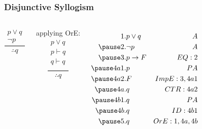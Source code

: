 \documentclass[dvipsnames]{beamer}
\begin{document}
\begin{frame}
  \frametitle{Disjunctive Syllogism}

  \begin{columns}
    \[
    \frac
      {
        \begin{array}{c}
          p \vee q\\
          \neg p
        \end{array}
      }
      {
        \therefore q
      }
    \]

    \pause
    \bigskip
    applying OrE:
    \[
    \frac
      {
        \begin{array}{c}
          p \vee q\\
          p \vdash q\\
          q \vdash q\\
        \end{array}
      }
      {
        \therefore q
      }
    \]

    \pause
    \begin{eqnarray*}
      1.   & p \vee q        & A\\
      \pause
      2.   & \neg p          & A\\
      \pause
      3.   & p \rightarrow F & EQ:2\\
      \pause
      4a1. & p               & PA\\
      \pause
      4a2. & F               & ImpE:3,4a1\\
      \pause
      4a.  & q               & CTR:4a2\\
      \pause
      4b1. & q               & PA\\
      \pause
      4b.  & q               & ID:4b1\\
      \pause
      5.   & q               & OrE:1,4a,4b
    \end{eqnarray*}
  \end{columns}
\end{frame}
\end{document}
